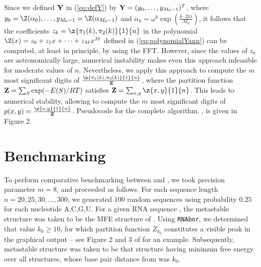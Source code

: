 Since we defined $\bf Y$ in (\ref{eq:defY}) by ${\bf Y} =
(y_0,\ldots,y_{M_0-1})^T$, where
$y_0=\Z(\alpha_0),\ldots, y_{M_0-1}=\Z(\alpha_{M_0-1})$ and $\alpha_k = \omega^k
\exp(\frac{k \cdot 2\pi i}{M_0})$,
it follows that the coefficients
$z_k=\z{\pi_1(k),\pi_2(k)}{1}{n}$ in the polynomial
$\Z(x) = z_0 + z_1 x + \cdots + z_{M} x^{M}$ defined in
(\ref{eq:polynomialYann}) can be computed, at least in principle,
by using the FFT. However, since the values of
$z_{k}$ are astronomically large, numerical
instability makes even this approach infeasible for moderate values of $n$.
Nevertheless, we apply this approach to compute the $m$ most significant
digits of $\frac{\z{\pi_1(k),\pi_2(k)}{1}{n}}{{\bf Z}}$,
where the partition function ${\bf Z} = \sum_{S} \exp(-E(S)/RT)$ satisfies
${{\bf Z}} = \sum_{x,y} \z{x,y}{1}{n}$. This leads to numerical stability,
allowing \ffttwo to compute the
$m$ most significant digits of $p(x,y) = \frac{\z{x,y}{1}{n}}{{\bf Z}}$.
Pseudocode for the complete algorithm, \fftbor, is given in
Figure 2.


\section{Benchmarking}
\label{section:benchmarking}

To perform comparative benchmarking between \rnatwofold and \ffttwo,
we took precision parameter $m=8$, and proceeded as follows.
For each sequence length $n = 20,25,30,\ldots,300$, we generated
$100$ random sequences using probability $0.25$ for each nucleotide A,C,G,U.
For a given RNA sequence \seq, the metastable structure \strA was
taken to be the MFE structure of \seq.
Using {\tt RNAbor}, we determined that value $k_0\geq 10$, for which
partition function $Z_{k_0}$ constitutes a visible peak in the graphical
output -- see Figure 2 and 3 of  \citep{Freyhult.b07} for an example.
Subsequently, metastable structure \strB was taken to be that structure
having minimum free energy over all structures, whose base pair distance from
\strA was $k_0$.

